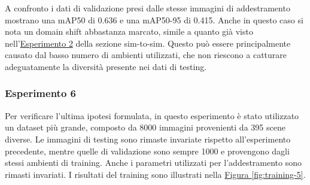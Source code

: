 \documentclass[12pt]{report}
\begin{document}
A confronto i dati di validazione presi dalle stesse immagini di addestramento mostrano una mAP50 di 0.636 e una mAP50-95 di 0.415. Anche in questo caso si nota un domain shift abbastanza marcato, simile a quanto già visto nell'\hyperref[sec:esperimento_2]{Esperimento 2} della sezione sim-to-sim. Questo può essere principalmente causato dal basso numero di ambienti utilizzati, che non riescono a catturare adeguatamente la diversità presente nei dati di testing.

\subsubsection{Esperimento 6}
\label{sec:esperimento_6}

Per verificare l'ultima ipotesi formulata, in questo esperimento è stato utilizzato un dataset più grande, composto da 8000 immagini provenienti da 395 scene diverse. Le immagini di testing sono rimaste invariate rispetto all'esperimento precedente, mentre quelle di validazione sono sempre 1000 e provengono dagli stessi ambienti di training. Anche i parametri utilizzati per l'addestramento sono rimasti invariati. I risultati del training sono illustrati nella \hyperref[fig:training-5]{Figura \ref{fig:training-5}}.
\end{document}
